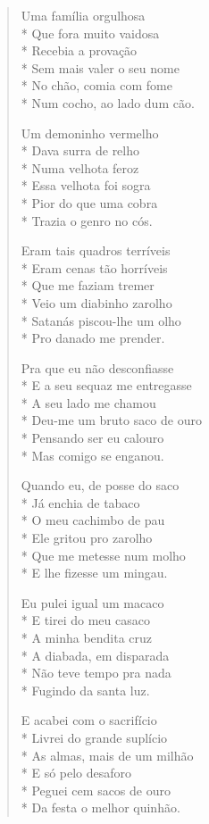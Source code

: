 \begin{verse}
Uma família orgulhosa\\*
Que fora muito vaidosa\\*
Recebia a provação\\*
Sem mais valer o seu nome\\*
No chão, comia com fome\\*
Num cocho, ao lado dum cão.

Um demoninho vermelho\\*
Dava surra de relho \\*
Numa velhota feroz\\*
Essa velhota foi sogra\\*
Pior do que uma cobra\\*
Trazia o genro no cós.

Eram tais quadros terríveis\\*
Eram cenas tão horríveis\\*
Que me faziam tremer\\*
Veio um diabinho zarolho\\*
Satanás piscou-lhe um olho\\*
Pro danado me prender.

Pra que eu não desconfiasse\\*
E a seu sequaz me entregasse\\*
A seu lado me chamou\\*
Deu-me um bruto saco de ouro\\*
Pensando ser eu calouro\\*
Mas comigo se enganou.

Quando eu, de posse do saco\\*
Já enchia de tabaco\\*
O meu cachimbo de pau\\*
Ele gritou pro zarolho\\*
Que me metesse num molho\\*
E lhe fizesse um mingau.

Eu pulei igual um macaco\\*
E tirei do meu casaco\\*
A minha bendita cruz\\*
A diabada, em disparada\\*
Não teve tempo pra nada\\*
Fugindo da santa luz.

E acabei com o sacrifício\\*
Livrei do grande suplício\\*
As almas, mais de um milhão\\*
E só pelo desaforo\\*
Peguei cem sacos de ouro\\*
Da festa o melhor quinhão.


\end{verse}

